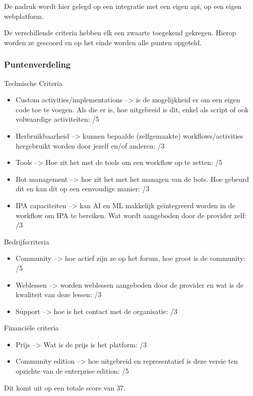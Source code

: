 De nadruk wordt hier gelegd op een integratie met een eigen \acrshort{api}, op een eigen webplatform.

De verschillende criteria hebben elk een zwaarte toegekend gekregen. Hierop worden ze gescoord en op het einde worden alle punten opgeteld.

\subsubsection{Puntenverdeling}
Technische Criteria
\begin{itemize}
	\item Custom activities/implementations --> is de mogelijkheid er om een eigen code toe te voegen. Als die er is, hoe uitgebreid is dit, enkel als script of ook volwaardige activiteiten: /5
	\item Herbruikbaarheid --> kunnen bepaalde (zelfgemaakte) workflows/activities hergebruikt worden door jezelf en/of anderen: /3
	\item Tools --> Hoe zit het met de tools om een workflow op te zetten: /5
	\item Bot management --> hoe zit het met het managen van de bots. Hoe gebeurd dit en kan dit op een eenvoudige manier: /3
	\item IPA capaciteiten --> kan AI en ML makkelijk geïntegreerd worden in de workflow om IPA te bereiken. Wat wordt aangeboden door de provider zelf: /3
\end{itemize}

Bedrijfscriteria
\begin{itemize}
	\item Community --> hoe actief zijn ze op het forum, hoe groot is de community: /5
	\item Weblessen --> worden weblessen aangeboden door de provider en wat is de kwaliteit van deze lessen: /3
	\item Support --> hoe is het contact met de organisatie: /3
\end{itemize}

Financiële criteria
\begin{itemize}
	\item Prijs --> Wat is de prijs is het platform: /3
	\item Community edition --> hoe uitgebreid en representatief is deze versie ten opzichte van de enterprise edition: /5
\end{itemize}

Dit komt uit op een totale score van 37.

